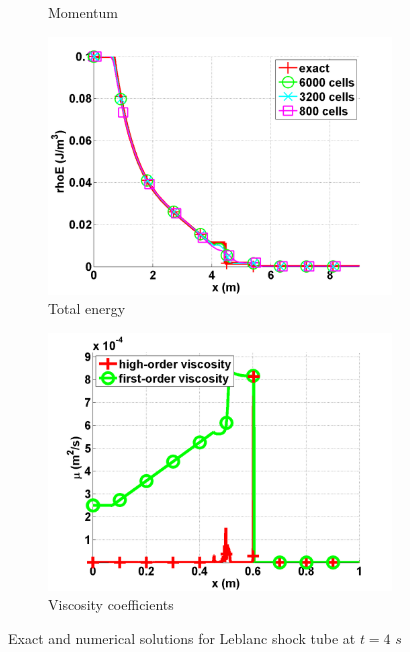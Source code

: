 \begin{figure}[H]
\begin{subfigure}[b]{0.495\textwidth}
                \caption{Momentum}
                \label{fig:1d_leblanc_density}
        \end{subfigure}
        \begin{subfigure}[b]{0.495\textwidth}
                \centering
                \includegraphics[width=\textwidth]{figures/Leblanc_exact_and_numerical_stt_total_energy_6000.png}
                \caption{Total energy}
                \label{fig:1d_leblanc_press}
        \end{subfigure}
        \begin{subfigure}[b]{0.495\textwidth}
                \centering
                \includegraphics[width=\textwidth]{figures/Leblanc_viscosity_numerical_6000.png}
                \caption{Viscosity coefficients}
                \label{fig:1d_leblanc_visc}
        \end{subfigure}
        \caption{Exact and numerical solutions for Leblanc shock tube at $t=4$ $s$}\label{fig:1d_leblanc}
\end{figure}
